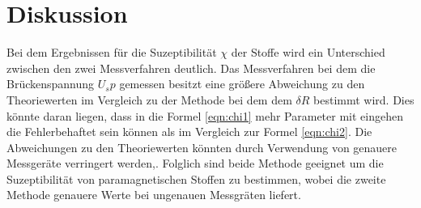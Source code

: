\section{Diskussion}
\label{sec:Diskussion}
Bei dem Ergebnissen für die Suzeptibilität $\chi$
der Stoffe wird ein Unterschied
zwischen den zwei Messverfahren deutlich.
Das Messverfahren bei dem die Brückenspannung $U_sp$ gemessen besitzt
eine größere Abweichung zu den Theoriewerten
im Vergleich zu der Methode bei dem dem $\delta R$ bestimmt wird.
Dies könnte daran liegen, dass in die Formel \eqref{eqn:chi1}
mehr Parameter mit eingehen die Fehlerbehaftet sein können als im
Vergleich zur Formel \eqref{eqn:chi2}.
Die Abweichungen zu den Theoriewerten könnten
durch Verwendung von genauere Messgeräte verringert werden,.
Folglich sind beide Methode   geeignet um die Suzeptibilität
von paramagnetischen Stoffen zu bestimmen, wobei die
zweite Methode genauere Werte bei ungenauen Messgräten liefert.
